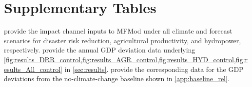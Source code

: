 \documentclass[
  final,
  10pt,
  letterpaper,
  english,
]{article}
\begin{document}
\FloatBarrier
\clearpage


\section{Supplementary Tables}
\label{app:data_tables}

provide the impact channel inputs to MFMod under all climate and forecast
scenarios for disaster risk reduction, agricultural productivity, and hydropower,
respectively. 
provide the annual GDP deviation data underlying \cref{fig:results_DRR_control,fig:results_AGR_control,fig:results_HYD_control,fig:results_All_control}
in \cref{sec:results}.
provide the corresponding data for the GDP deviations from the no-climate-change
baseline shown in \cref{app:baseline_rel}.















\FloatBarrier
\clearpage
\end{document}
